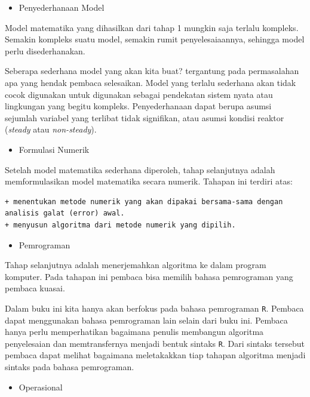 \documentclass[]{book}
\providecommand{\tightlist}{%
  \setlength{\itemsep}{0pt}\setlength{\parskip}{0pt}}
\theoremstyle{definition}
\theoremstyle{definition}
\theoremstyle{definition}
\theoremstyle{remark}
\begin{document}
\begin{itemize}
\tightlist
\item
  Penyederhanaan Model
\end{itemize}

Model matematika yang dihasilkan dari tahap 1 mungkin saja terlalu kompleks. Semakin kompleks suatu model, semakin rumit penyelesaiaannya, sehingga model perlu disederhanakan.

Seberapa sederhana model yang akan kita buat? tergantung pada permasalahan apa yang hendak pembaca selesaikan. Model yang terlalu sederhana akan tidak cocok digunakan untuk digunakan sebagai pendekatan sistem nyata atau lingkungan yang begitu kompleks. Penyederhanaan dapat berupa asumsi sejumlah variabel yang terlibat tidak signifikan, atau asumsi kondisi reaktor (\emph{steady} atau \emph{non-steady}).

\begin{itemize}
\tightlist
\item
  Formulasi Numerik
\end{itemize}

Setelah model matematika sederhana diperoleh, tahap selanjutnya adalah memformulasikan model matematika secara numerik. Tahapan ini terdiri atas:

\begin{verbatim}
+ menentukan metode numerik yang akan dipakai bersama-sama dengan analisis galat (error) awal.
+ menyusun algoritma dari metode numerik yang dipilih.
\end{verbatim}

\begin{itemize}
\tightlist
\item
  Pemrograman
\end{itemize}

Tahap selanjutnya adalah menerjemahkan algoritma ke dalam program komputer. Pada tahapan ini pembaca bisa memilih bahasa pemrograman yang pembaca kuasai.

Dalam buku ini kita hanya akan berfokus pada bahasa pemrograman \texttt{R}. Pembaca dapat menggunakan bahasa pemrograman lain selain dari buku ini. Pembaca hanya perlu memperhatikan bagaimana penulis membangun algoritma penyelesaian dan memtransfernya menjadi bentuk sintaks \texttt{R}. Dari sintaks tersebut pembaca dapat melihat bagaimana meletakakkan tiap tahapan algoritma menjadi sintaks pada bahasa pemrograman.

\begin{itemize}
\tightlist
\item
  Operasional
\end{itemize}
\end{document}
